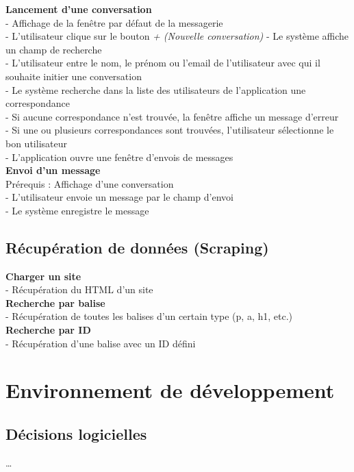 \documentclass[conference]{IEEEtran}
\begin{document}
\textbf{Lancement d'une conversation}\\
- Affichage de la fenêtre par défaut de la messagerie\\
- L'utilisateur clique sur le bouton \textit{+ (Nouvelle conversation)}
- Le système affiche un champ de recherche\\
- L'utilisateur entre le nom, le prénom ou l'email de l'utilisateur avec qui il souhaite initier une conversation\\
- Le système recherche dans la liste des utilisateurs de l'application une correspondance\\
- Si aucune correspondance n'est trouvée, la fenêtre affiche un message d'erreur\\
- Si une ou plusieurs correspondances sont trouvées, l'utilisateur sélectionne le bon utilisateur\\
- L'application ouvre une fenêtre d'envois de messages\\

\textbf{Envoi d'un message}\\
Prérequis : Affichage d'une conversation\\
- L'utilisateur envoie un message par le champ d'envoi\\
- Le système enregistre le message\\

\subsection{Récupération de données (Scraping)}
\textbf{Charger un site}\\
- Récupération du HTML d'un site\\

\textbf{Recherche par balise}\\
- Récupération de toutes les balises d'un certain type (p, a, h1, etc.)\\

\textbf{Recherche par ID}\\
- Récupération d'une balise avec un ID défini\\


\section{Environnement de développement}

\subsection{Décisions logicielles}
…
\end{document}
